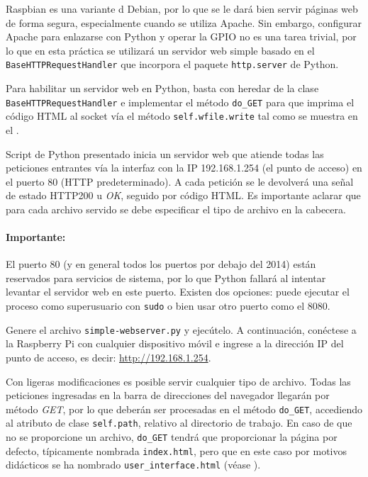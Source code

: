\documentclass[letterpaper,10.5pt]{article}
\begin{document}
Raspbian es una variante d Debian, por lo que se le dará bien servir páginas web de forma segura, especialmente cuando se utiliza Apache.
Sin embargo, configurar Apache para enlazarse con Python y operar la GPIO no es una tarea trivial, por lo que en esta práctica se utilizará un servidor web simple basado en el \texttt{BaseHTTPRequestHandler} que incorpora el paquete \texttt{http.server} de Python.

Para habilitar un servidor web en Python, basta con heredar de la clase \texttt{BaseHTTPRequestHandler} e implementar el método \texttt{do\_GET} para que imprima el código HTML al socket vía el método \texttt{self.wfile.write} tal como se muestra en el .



Script de Python presentado inicia un servidor web que atiende todas las peticiones entrantes vía la interfaz con la IP 192.168.1.254 (el punto de acceso) en el puerto 80 (HTTP predeterminado).
A cada petición se le devolverá una señal de estado HTTP200 u \emph{OK}, seguido por código HTML. %
Es importante aclarar que para cada archivo servido se debe especificar el tipo de archivo en la cabecera.

\paragraph*{Importante:} El puerto 80 (y en general todos los puertos por debajo del 2014) están reservados para servicios de sistema, por lo que Python fallará al intentar levantar el servidor web en este puerto. Existen dos opciones: puede ejecutar el proceso como superusuario con \texttt{sudo} o bien usar otro puerto como el 8080.

Genere el archivo \texttt{simple-webserver.py} y ejecútelo.
A continuación, conéctese a la Raspberry Pi con cualquier dispositivo móvil e ingrese a la dirección IP del punto de acceso, es decir: \url{http://192.168.1.254}.


Con ligeras modificaciones es posible servir cualquier tipo de archivo.
Todas las peticiones ingresadas en la barra de direcciones del navegador llegarán por método \emph{GET}, por lo que deberán ser procesadas en el método \texttt{do\_GET}, accediendo al atributo de clase \texttt{self.path}, relativo al directorio de trabajo.
En caso de que no se proporcione un archivo, \texttt{do\_GET} tendrá que proporcionar la página por defecto, típicamente nombrada \texttt{index.html}, pero que en este caso por motivos didácticos se ha nombrado \texttt{user\_interface.html} (véase ).
\end{document}
